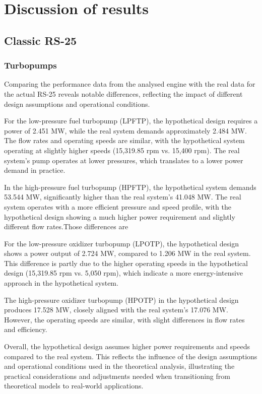 \section{Discussion of results}
\subsection{Classic RS-25}
\subsubsection{Turbopumps}
Comparing the performance data from the analysed engine with the real data for the actual RS-25  reveals notable differences, reflecting the impact of different design assumptions and operational conditions.

For the low-pressure fuel turbopump (LPFTP), the hypothetical design requires a power of 2.451 MW, while the real system demands approximately 2.484 MW. The flow rates and operating speeds are similar, with the hypothetical system operating at slightly higher speeds (15,319.85 rpm vs. 15,400 rpm). The real system’s pump operates at lower pressures, which translates to a lower power demand in practice.

In the high-pressure fuel turbopump (HPFTP), the hypothetical system demands 53.544 MW, significantly higher than the real system’s 41.048 MW. The real system operates with a more efficient pressure and speed profile, with the hypothetical design showing a much higher power requirement and slightly different flow rates.Those differences are 

For the low-pressure oxidizer turbopump (LPOTP), the hypothetical design shows a power output of 2.724 MW, compared to 1.206 MW in the real system. This difference is partly due to the higher operating speeds in the hypothetical design (15,319.85 rpm vs. 5,050 rpm), which indicate a more energy-intensive approach in the hypothetical system.

The high-pressure oxidizer turbopump (HPOTP) in the hypothetical design produces 17.528 MW, closely aligned with the real system’s 17.076 MW. However, the operating speeds are similar, with slight differences in flow rates and efficiency.

Overall, the hypothetical design assumes higher power requirements and speeds compared to the real system. This reflects the influence of the design assumptions and operational conditions used in the theoretical analysis, illustrating the practical considerations and adjustments needed when transitioning from theoretical models to real-world applications.

